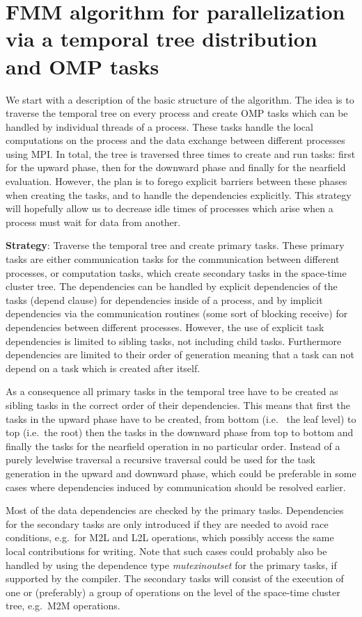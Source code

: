 \documentclass[a4paper,11pt]{article}
\theoremstyle{plain}
\theoremstyle{definition}
\theoremstyle{remark}
\begin{document}
\section{FMM algorithm for parallelization via a temporal tree distribution and OMP tasks}
We start with a description of the basic structure of the algorithm. The idea is to traverse the temporal tree on every
process and create OMP tasks which can be handled by individual threads of a process. These tasks handle the local 
computations on the process and the data exchange between different processes using MPI. In total, the tree is 
traversed three times to create and run tasks: first for the upward phase, then for the downward phase and finally for 
the nearfield evaluation. However, the plan is to forego explicit barriers between these phases when creating the 
tasks, and to handle the dependencies explicitly. This strategy will hopefully allow us to decrease idle times of 
processes which arise when a process must wait for data from another.

\textbf{Strategy}: Traverse the temporal tree and create primary tasks. These primary tasks are either communication
tasks for the communication between different processes, or computation tasks, which create secondary tasks in the 
space-time cluster tree. The dependencies can be handled by explicit dependencies of the tasks (depend clause) for 
dependencies inside of a process, and by implicit dependencies via the communication routines (some sort of blocking 
receive) for dependencies between different processes. However, the use of explicit task dependencies is limited to 
sibling tasks, not including child tasks. Furthermore dependencies are limited to their order of generation meaning 
that a task can not depend on a task which is created after itself.

As a consequence all primary tasks in the temporal tree have to be created as sibling tasks in the correct order of
their dependencies. This means that first the tasks in the upward phase have to be created, from bottom (i.e.~
the leaf level) to top (i.e.~the root) then the tasks in the downward phase from top to bottom and finally the tasks
for the nearfield operation in no particular order. Instead of a purely levelwise traversal a recursive traversal
could be used for the task generation in the upward and downward phase, which could be preferable in some cases where 
dependencies induced by communication should be resolved earlier. 

Most of the data dependencies are checked by the primary tasks. Dependencies for the secondary tasks are only 
introduced if they are needed to avoid race conditions, e.g.~for M2L and L2L operations, which possibly access the same 
local contributions for writing. Note that such cases could probably also be handled by using the dependence type 
\textit{mutexinoutset} for the primary tasks, if supported by the compiler. The secondary tasks will consist of the
execution of one or (preferably) a group of operations on the level of the space-time cluster tree, e.g.~M2M operations.
\end{document}
